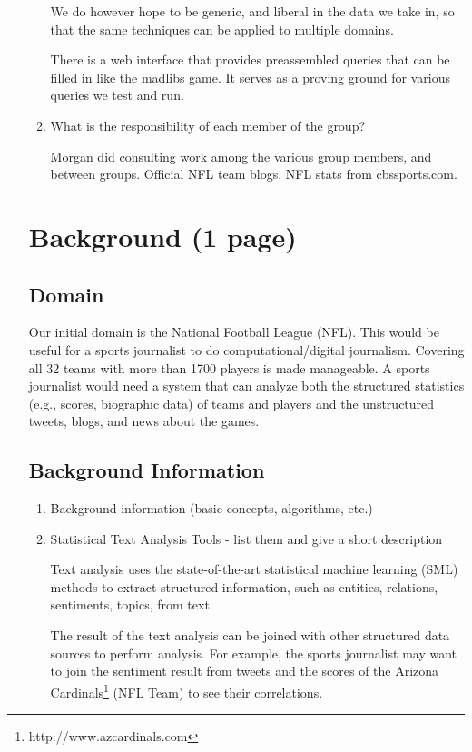 \documentclass{article}
\begin{document}
\begin{enumerate}
\begin{enumerate}
    We do however hope to be generic, and liberal in the data we take in, so that the same techniques can be applied to multiple domains.

    There is a web interface that provides preassembled queries that can be filled in like the madlibs game.
    It serves as a proving ground for various queries we test and run.

  \item What is the responsibility of each member of the group?



    Morgan did consulting work among the various group members, and between groups.
    Official NFL team blogs. NFL stats from cbssports.com.
  \end{enumerate}

  \section{Background (1 page)}
  \subsection{Domain}

  Our initial domain is the National Football League (NFL).
  This would be useful for a sports journalist to do computational/digital journalism.
  Covering all 32 teams with more than 1700 players is made manageable.
  A sports journalist would need a system
  that can analyze both the
  structured statistics (e.g., scores, biographic data) of teams and players and the
  unstructured tweets, blogs, and news about the games.



  \subsection{Background Information}
  \begin{enumerate}
  \item Background information (basic concepts, algorithms, etc.)



  \item Statistical Text Analysis Tools - list them and give a short description

    Text analysis uses the state-of-the-art statistical machine learning (SML) methods to extract structured information,
    such as entities, relations, sentiments, topics, from text.

    The result of the text analysis can be joined with other
    structured data sources to perform analysis. For example, the sports
    journalist may want to join the sentiment result from tweets and the
    scores of the Arizona Cardinals\footnote{http://www.azcardinals.com}
    (NFL Team) to see their correlations.



\end{enumerate}
\end{enumerate}
\end{document}
